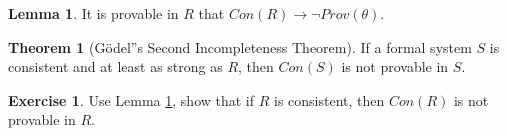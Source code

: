 \documentclass[11pt]{article}
\theoremstyle{definition}
\newtheorem{exer}{Exercise}
\newtheorem{theorem}{Theorem}[section]
\newtheorem{lem}[thm]{Lemma}
\begin{document}
\begin{lem} \label{lemma}
It is provable in $R$ that $Con(R) \rightarrow \neg Prov(\theta)$.
\end{lem}

\begin{theorem}[G\"odel''s Second Incompleteness Theorem]
If a formal system $S$ is consistent and at least as strong as $R$, then $Con(S)$ is not provable in $S$.
\end{theorem}

\begin{exer}
Use Lemma \ref{lemma}, show that if $R$ is consistent, then $Con(R)$ is not provable in $R$.
\end{exer}
\end{document}
